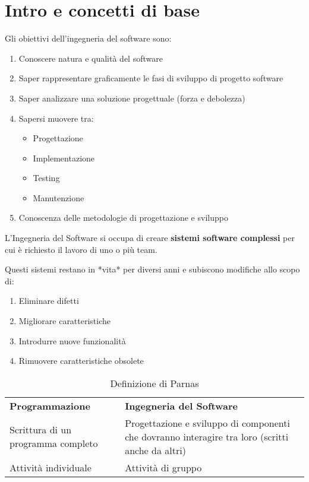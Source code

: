 \chapter{Intro e concetti di base}

Gli obiettivi dell'ingegneria del software sono:
\begin{enumerate}
    \item Conoscere natura e qualità del software
    \item Saper rappresentare graficamente le fasi di sviluppo di progetto software
    \item Saper analizzare una soluzione progettuale (forza e debolezza)
    \item Sapersi muovere tra:
    \begin{itemize}
        \item Progettazione
        \item Implementazione
        \item Testing
        \item Manutenzione
    \end{itemize}
    \item Conoscenza delle metodologie di progettazione e sviluppo
\end{enumerate}

L'Ingegneria del Software si occupa di creare \textbf{sistemi software complessi} per cui è richiesto il lavoro di uno o più team.

Questi sistemi restano in *vita* per diversi anni e subiscono modifiche allo scopo di:
\begin{enumerate}
    \item Eliminare difetti
    \item Migliorare caratteristiche
    \item Introdurre nuove funzionalità
    \item Rimuovere caratteristiche obsolete
\end{enumerate}

\begin{table}[h!]
    \centering
    \begin{tabularx}{\textwidth}{|X|X|}
        \textbf{Programmazione} & \textbf{Ingegneria del Software} \\
        Scrittura di un programma completo & Progettazione e sviluppo di componenti che dovranno interagire tra loro (scritti anche da altri) \\
        Attività individuale & Attività di gruppo \\
    \end{tabularx}
    \caption{Definizione di Parnas}
\end{table}

